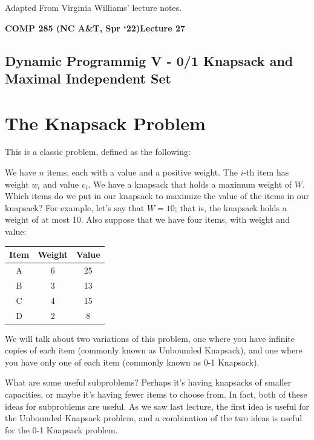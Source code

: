 \documentclass [12pt]{article}
\theoremstyle{definition}
\begin{document}
 

\vspace {1em} 
\begin {Instruction} 
Adapted From Virginia Williams' lecture notes.
\end {Instruction}  

{\LARGE \textbf {COMP 285 (NC A\&T, Spr `22)}\hfill \textbf {Lecture 27} } 

\begin{centering}
\section*{Dynamic Programmig V - 0/1 Knapsack and Maximal Independent Set}
\end{centering}

\section{The Knapsack Problem}
 
This is a classic problem, defined as the following:

We have $n$ items, each with a value and a positive weight. The $i$-th item has weight $w_i$ and value $v_i$. We have a knapsack that holds a maximum weight of $W$. Which items do we put in our knapsack to maximize the value of the items in our knapsack? For example, let’s say that $W = 10$; that is, the knapsack holds a weight of at most 10. Also suppose that we have four items, with weight and value:

\begin{table}[h!]
\centering
\begin{tabular}{c|c|c}
Item & Weight & Value \\
\hline
A & 6 &  25 \\
B & 3 & 13 \\
C & 4 & 15 \\
D & 2 & 8
\end{tabular}
\end{table}

We will talk about two variations of this problem, one where you have infinite copies of each item (commonly known as Unbounded Knapsack), and one where you have only one of each item (commonly known as 0-1 Knapsack). 

What are some useful subproblems? Perhaps it’s having knapsacks of smaller capacities, or maybe it’s having fewer items to choose from. In fact, both of these ideas for subproblems are useful. As we saw last lecture, the first idea is useful for the Unbounded Knapsack problem, and a combination of the two ideas is useful for the 0-1 Knapsack problem.
\end{document}
